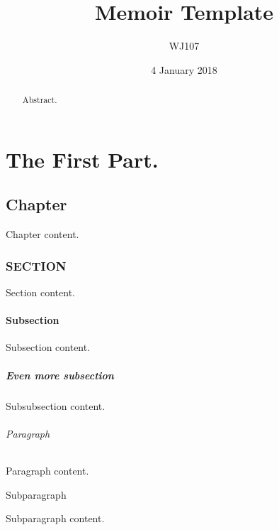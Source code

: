 \documentclass[12pt]{memoir}
\begin{document}
\title{Memoir Template}
\author{WJ107}
\date{4 January 2018}
\maketitle

\renewcommand{\abstractname}{abstract}
\begin{abstract}
Abstract.
\end{abstract}


\part{The First Part.}   

\chapter{Chapter}
Chapter content.

\section{SECTION}
Section content.

\subsection{Subsection}
Subsection content.

\subsubsection{Even more subsection}
Subsubsection content.

\paragraph{Paragraph}
Paragraph content.

\subparagraph{Subparagraph}
Subparagraph content.
\end{document}
